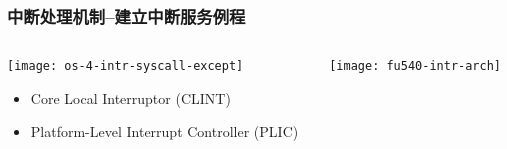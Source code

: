 \begin{frame}[plain,t]
	\frametitle{中断处理机制--建立中断服务例程}
	\begin{columns}
		
		\begin{column}{0.45\textwidth}
			\centering
			\texttt{[image: os-4-intr-syscall-except]}
			\begin{itemize} \small
				\item Core Local	Interruptor (CLINT)
				\item Platform-Level Interrupt Controller (PLIC)
			\end{itemize}
			
		\end{column}
		
		\begin{column}{0.5\textwidth}
			
			\texttt{[image: fu540-intr-arch]}	
%			
			
		\end{column}
		
	\end{columns}
	
\end{frame}



